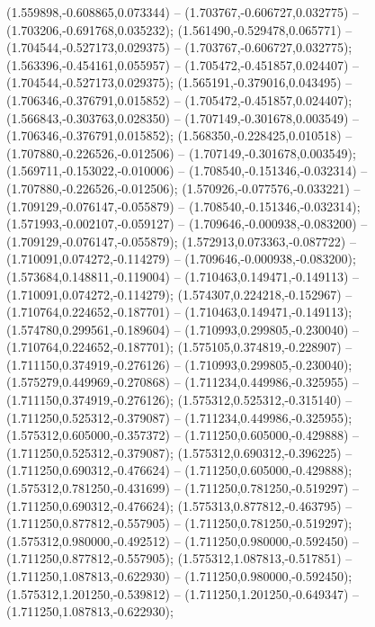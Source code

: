  (1.559898,-0.608865,0.073344) -- (1.703767,-0.606727,0.032775) -- (1.703206,-0.691768,0.035232);
 (1.561490,-0.529478,0.065771) -- (1.704544,-0.527173,0.029375) -- (1.703767,-0.606727,0.032775);
 (1.563396,-0.454161,0.055957) -- (1.705472,-0.451857,0.024407) -- (1.704544,-0.527173,0.029375);
 (1.565191,-0.379016,0.043495) -- (1.706346,-0.376791,0.015852) -- (1.705472,-0.451857,0.024407);
 (1.566843,-0.303763,0.028350) -- (1.707149,-0.301678,0.003549) -- (1.706346,-0.376791,0.015852);
 (1.568350,-0.228425,0.010518) -- (1.707880,-0.226526,-0.012506) -- (1.707149,-0.301678,0.003549);
 (1.569711,-0.153022,-0.010006) -- (1.708540,-0.151346,-0.032314) -- (1.707880,-0.226526,-0.012506);
 (1.570926,-0.077576,-0.033221) -- (1.709129,-0.076147,-0.055879) -- (1.708540,-0.151346,-0.032314);
 (1.571993,-0.002107,-0.059127) -- (1.709646,-0.000938,-0.083200) -- (1.709129,-0.076147,-0.055879);
 (1.572913,0.073363,-0.087722) -- (1.710091,0.074272,-0.114279) -- (1.709646,-0.000938,-0.083200);
 (1.573684,0.148811,-0.119004) -- (1.710463,0.149471,-0.149113) -- (1.710091,0.074272,-0.114279);
 (1.574307,0.224218,-0.152967) -- (1.710764,0.224652,-0.187701) -- (1.710463,0.149471,-0.149113);
 (1.574780,0.299561,-0.189604) -- (1.710993,0.299805,-0.230040) -- (1.710764,0.224652,-0.187701);
 (1.575105,0.374819,-0.228907) -- (1.711150,0.374919,-0.276126) -- (1.710993,0.299805,-0.230040);
 (1.575279,0.449969,-0.270868) -- (1.711234,0.449986,-0.325955) -- (1.711150,0.374919,-0.276126);
 (1.575312,0.525312,-0.315140) -- (1.711250,0.525312,-0.379087) -- (1.711234,0.449986,-0.325955);
 (1.575312,0.605000,-0.357372) -- (1.711250,0.605000,-0.429888) -- (1.711250,0.525312,-0.379087);
 (1.575312,0.690312,-0.396225) -- (1.711250,0.690312,-0.476624) -- (1.711250,0.605000,-0.429888);
 (1.575312,0.781250,-0.431699) -- (1.711250,0.781250,-0.519297) -- (1.711250,0.690312,-0.476624);
 (1.575313,0.877812,-0.463795) -- (1.711250,0.877812,-0.557905) -- (1.711250,0.781250,-0.519297);
 (1.575312,0.980000,-0.492512) -- (1.711250,0.980000,-0.592450) -- (1.711250,0.877812,-0.557905);
 (1.575312,1.087813,-0.517851) -- (1.711250,1.087813,-0.622930) -- (1.711250,0.980000,-0.592450);
 (1.575312,1.201250,-0.539812) -- (1.711250,1.201250,-0.649347) -- (1.711250,1.087813,-0.622930);

